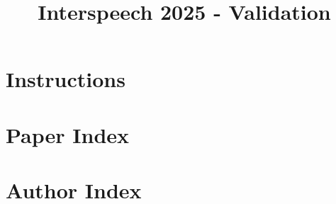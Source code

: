 \documentclass[twoside, noabstract]{\VAR{classname}}
\title{Interspeech 2025 - Validation}
\author{ }
\begin{document}
\maketitle{}
\tableofcontents



\def\emailtruncatelength{2cm}
\def\titletruncatelength{4cm}

\pagestyle{fancy}

\section{Instructions}



\clearpage

\section{Paper Index}
\label{section:paper_index}



\clearpage

\section{Author Index}
\label{section:author_index}


\end{document}

